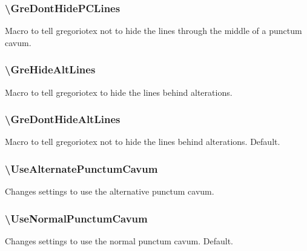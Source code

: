 \subsubsection*{\textbackslash GreDontHidePCLines}
Macro to tell gregoriotex not to hide the lines through the middle of
a punctum cavum.

\subsubsection*{\textbackslash GreHideAltLines}	
Macro to tell gregoriotex to hide the lines behind alterations.

\subsubsection*{\textbackslash GreDontHideAltLines}
Macro to tell gregoriotex not to hide the lines behind alterations.
Default.

\subsubsection*{\textbackslash UseAlternatePunctumCavum}
Changes settings to use the alternative punctum cavum.

\subsubsection*{\textbackslash UseNormalPunctumCavum}
Changes settings to use the normal punctum cavum.  Default.

